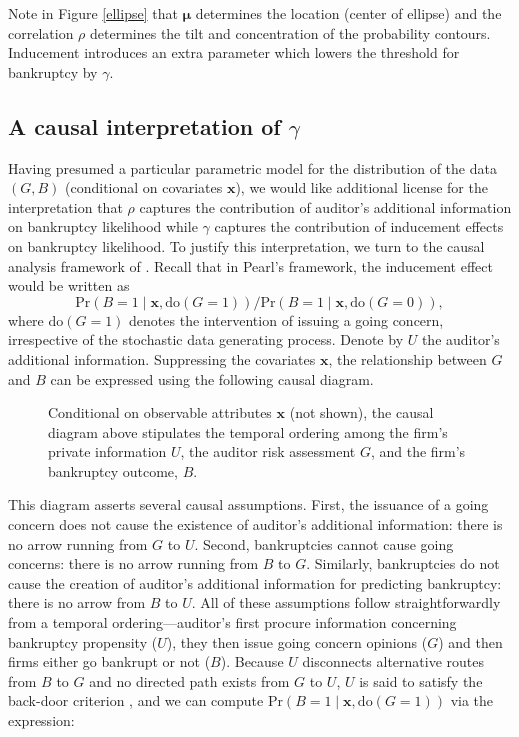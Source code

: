 \documentclass[aoas,preprint, 11pt, dvipsnames, table, x11name]{imsart}
\renewcommand{\bm}[1]{\mathbf{#1}}
\theoremstyle{remark}
\begin{document}
Note in Figure \ref{ellipse} that $\bm{\mu}$ determines the location (center of ellipse) and the correlation $\rho$ determines the tilt and concentration of the probability contours. Inducement introduces an extra parameter which lowers the threshold for bankruptcy by $\gamma$.  


\subsection{A causal interpretation of $\gamma$}
Having presumed a particular parametric model for the distribution of the data $(G,B)$ (conditional on covariates $\mathbf{x}$), we would like additional license for the interpretation that $\rho$ captures the contribution of auditor's additional information on bankruptcy likelihood while $\gamma$ captures the contribution of inducement effects on bankruptcy likelihood. To justify this interpretation, we turn to the causal analysis framework of \cite{pearl-2000}. Recall that in Pearl's framework, the inducement effect would be written as 
\begin{equation}\label{docalc}
\mbox{Pr}(B = 1 \mid \mathbf{x}, \text{do}(G = 1)) / \mbox{Pr}(B = 1 \mid \mathbf{x}, \text{do}(G = 0)),
\end{equation}
where $\text{do}(G=1)$ denotes the intervention of issuing a going concern, irrespective of the stochastic data generating process. Denote by $U$ the auditor's additional information.  Suppressing the covariates $\mathbf{x}$, the relationship between $G$ and $B$ can be expressed using the following causal diagram.
\begin{figure}[h!]
\caption{Conditional on observable attributes $\mathbf{x}$ (not shown), the causal diagram above stipulates the temporal ordering among the firm's private information $U$, the auditor risk assessment $G$, and the firm's bankruptcy outcome, $B$.}\label{causaldiag} 
\end{figure}
This diagram asserts several causal assumptions.  First, the issuance of a going concern does not cause the existence of auditor's additional information:  there is no arrow running from $G$ to $U$.  Second, bankruptcies cannot cause going concerns:  there is no arrow running from $B$ to $G$.  Similarly, bankruptcies do not cause the creation of auditor's additional information for predicting bankruptcy:  there is no arrow from $B$ to $U$.  All of these assumptions follow straightforwardly from a temporal ordering---auditor's first procure information concerning bankruptcy propensity ($U$), they then issue going concern opinions ($G$) and then firms either go bankrupt or not ($B$).  Because $U$ disconnects alternative routes from $B$ to $G$ and no directed path exists from $G$ to $U$, $U$ is said to satisfy the back-door criterion \cite{pearl-2000}, and we can compute $\mbox{Pr}(B = 1 \mid \mathbf{x}, \text{do}(G = 1))$ via the expression:
\end{document}
